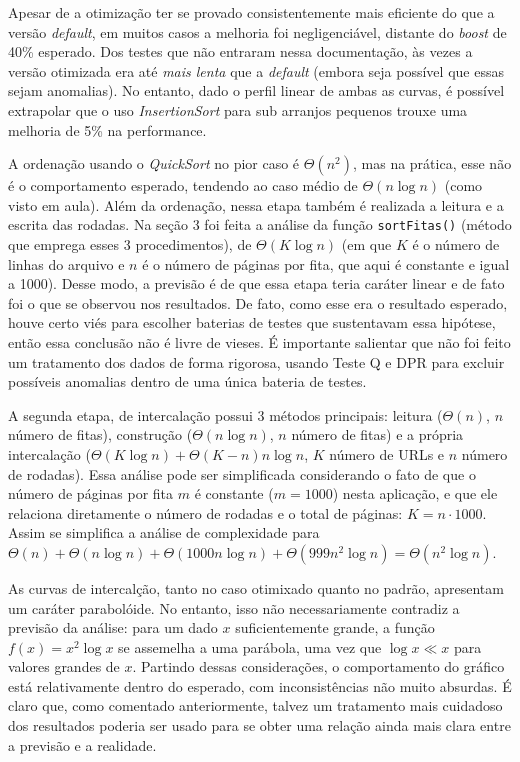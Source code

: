 \documentclass{article}
\def\code#1{\texttt{#1}}
\begin{document}
Apesar de a otimização ter se provado consistentemente mais eficiente do que a versão \textit{default}, em muitos casos a melhoria foi negligenciável, distante do \textit{boost} de 40\% esperado. Dos testes que não entraram nessa documentação, às vezes a versão otimizada era até \textit{mais lenta} que a \textit{default} (embora seja possível que essas sejam anomalias). No entanto, dado o perfil linear de ambas as curvas, é possível extrapolar que o uso \textit{InsertionSort} para sub arranjos pequenos trouxe uma melhoria de 5\% na performance.

A ordenação usando o \textit{QuickSort} no pior caso é \( \Theta(n^2) \), mas na prática, esse não é o comportamento esperado, tendendo ao caso médio de \( \Theta(n \log n) \) (como visto em aula). Além da ordenação, nessa etapa também é realizada a leitura e a escrita das rodadas. Na seção 3 foi feita a análise da função \code{sortFitas()} (método que emprega esses 3 procedimentos), de \( \Theta(K \log n) \) (em que \( K \) é o número de linhas do arquivo e \( n \) é o número de páginas por fita, que aqui é constante e igual a 1000). Desse modo, a previsão é de que essa etapa teria caráter linear e de fato foi o que se observou nos resultados. De fato, como esse era o resultado esperado, houve certo viés para escolher baterias de testes que sustentavam essa hipótese, então essa conclusão não é livre de vieses. É importante salientar que não foi feito um tratamento dos dados de forma rigorosa, usando Teste Q e DPR para excluir possíveis anomalias dentro de uma única bateria de testes.

A segunda etapa, de intercalação possui 3 métodos principais: leitura (\( \Theta(n) \), \( n \) número de fitas), construção (\( \Theta(n \log n) \), \( n \) número de fitas) e a própria intercalação (\( \Theta(K \log n) + \Theta(K - n)n \log n \), \( K \) número de URLs e \( n \) número de rodadas). Essa análise pode ser simplificada considerando o fato de que o número de páginas por fita \( m \) é constante (\( m = 1000 \)) nesta aplicação, e que ele relaciona diretamente o número de rodadas e o total de páginas: \( K = n \cdot 1000 \). Assim se simplifica a análise de complexidade para \( \Theta(n) + \Theta(n \log n) + \Theta(1000n \log n) + \Theta(999n^2 \log n) = \Theta(n^2 \log n) \).

As curvas de intercalção, tanto no caso otimixado quanto no padrão, apresentam um caráter parabolóide. No entanto, isso não necessariamente contradiz a previsão da análise: para um dado \( x \) suficientemente grande, a função \( f(x) = x^2 \log x \) se assemelha a uma parábola, uma vez que \( \log x \ll x \) para valores grandes de \( x \). Partindo dessas considerações, o comportamento do gráfico está relativamente dentro do esperado, com inconsistências não muito absurdas. É claro que, como comentado anteriormente, talvez um tratamento mais cuidadoso dos resultados poderia ser usado para se obter uma relação ainda mais clara entre a previsão e a realidade.
\end{document}
